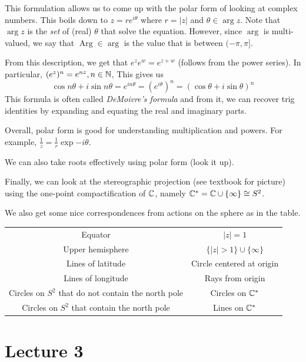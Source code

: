 \documentclass[11pt,leqno,oneside]{amsart}
\numberwithin{thm}{section}
\newcommand{\Arg}{\operatorname{Arg}}
\begin{document}
This formulation allows us to come up with the polar form of looking at complex
numbers. This boils down to $z = r e^{i \theta}$ where $r = |z|$ and $\theta
\in \arg z$. Note that $\arg z$ is the \emph{set} of (real) $\theta$ that solve
the equation. However, since $\arg$ is multi-valued, we say that $\Arg \in
\arg$ is the value that is between $(-\pi, \pi]$.

From this description, we get that $e^z e^w = e^{z+w}$ (follows from the power series). In particular, $(e^z)^n = e^{nz}, n \in {\mathbb N}$, This gives us \[
    \cos n \theta + i \sin n \theta = e^{in\theta} = (e^{i\theta})^n = (\cos \theta + i \sin \theta)^n
\]
This formula is often called \emph{DeMoivre's formula} and from it, we can
recover trig identities by expanding and equating the real and imaginary parts.

Overall, polar form is good for understanding multiplication and powers. For example, $\frac{1}{z} = \frac{1}{r} \exp{-i \theta}$.

We can also take roots effectively using polar form (look it up).

Finally, we can look at the stereographic projection (see textbook for picture) using the one-point compactification of ${\mathbb C}$, namely ${\mathbb C}^* = {\mathbb C} \cup \{\infty\} \cong S^2$.

We also get some nice correspondences from actions on the sphere as in the table. \\
    \begin{tabular}{|c|c|}
        \hline
        Equator & $|z| = 1$ \\
        Upper hemisphere & $\{|z| > 1\} \cup \{\infty\}$ \\
        Lines of latitude & Circle centered at origin \\
        Lines of longitude & Rays from origin \\
        Circles on $S^2$ that do not contain the north pole & Circles on ${\mathbb C}^*$ \\
        Circles on $S^2$ that contain the north pole & Lines on ${\mathbb C}^*$ \\
        \hline
    \end{tabular}
\section{Lecture 3}
\end{document}
